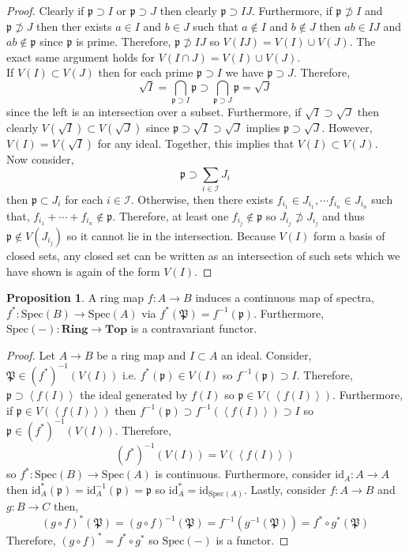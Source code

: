 \documentclass[12pt]{article}
\newcommand{\id}{\mathrm{id}}
\newcommand{\Ring}{\mathbf{Ring}}
\newcommand{\Spec}[1]{\mathrm{Spec}\left( #1 \right)}
\newcommand{\p}{\mathfrak{p}}
\renewcommand{\P}{\mathfrak{P}}
\theoremstyle{remark}
\theoremstyle{definition}
\newtheorem{proposition}[theorem]{Proposition}
\begin{document}
\begin{proof}
Clearly if $\p \supset I$ or $\p \supset J$ then clearly $\p \supset IJ$. Furthermore, if $\p \not\supset I$ and $\p \not\supset J$ then ther exists $a \in I$ and $b \in J$ such that $a \notin I$ and $b \notin J$ then $ab \in IJ$ and $ab \notin \p$ since $\p$ is prime. Therefore, $\p \not\supset IJ$ so $V(IJ) = V(I) \cup V(J)$. The exact same argument holds for $V(I \cap J) = V(I) \cup V(J)$.
\bigskip\\
If $V(I) \subset V(J)$ then for each prime $\p \supset I$ we have $\p \supset J$. Therefore,
\[  \sqrt{I} = \bigcap_{\p \supset I} \p \supset \bigcap_{\p \supset J} \p = \sqrt{J} \]
since the left is an intersection over a subset. Furthermore, if $\sqrt{I} \supset \sqrt{J}$ then clearly $V(\sqrt{I}) \subset V(\sqrt{J})$ since $\p \supset \sqrt{I} \supset \sqrt{J}$ implies $\p \supset \sqrt{J}$. However, $V(I) = V(\sqrt{I})$ for any ideal. Together, this implies that $V(I) \subset V(J)$. 
\bigskip\\
Now consider,
\[ \p \supset \sum_{i \in \mathcal{I}} J_i \]
then $\p \subset J_i$ for each $i \in \mathcal{I}$. Otherwise, then there exists $f_{i_1} \in J_{i_1}, \cdots f_{i_n} \in J_{i_n}$ such that, $f_{i_1} + \cdots + f_{i_n} \notin \p$. Therefore, at least one $f_{i_j} \notin \p$ so $J_{i_j} \not\supset J_{i_j}$ and thus $\p \notin V(J_{i_j})$ so it cannot lie in the intersection.
\bigskip
Because $V(I)$ form a basis of closed sets, any closed set can be written as an intersection of such sets which we have shown is again of the form $V(I)$. 
\end{proof}

\newcommand{\Top}{\mathbf{Top}}

\begin{proposition}
A ring map $f : A \to B$ induces a continuous map of spectra, $f^* : \Spec{B} \to \Spec{A}$ via $f^*(\P) = f^{-1}(\p)$. Furthermore, $\Spec{-} : \Ring \to \Top$ is a contravariant functor.
\end{proposition}

\begin{proof}
Let $A \to B$ be a ring map and $I \subset A$ an ideal. Consider, $\P \in (f^*)^{-1}(V(I))$ i.e. $f^*(\p) \in V(I)$ so $f^{-1}(\p) \supset I$. Therefore, $\p \supset \left< f(I) \right>$ the ideal generated by $f(I)$ so $\p \in V(\left< f(I) \right>)$. Furthermore, if $\p \in V(\left< f(I) \right>)$ then $f^{-1}(\p) \supset f^{-1}(\left< f(I) \right>) \supset I$ so $\p \in (f^*)^{-1}(V(I))$. Therefore,
\[ (f^*)^{-1}(V(I)) = V(\left< f(I) \right>) \]
so $f^* : \Spec{B} \to \Spec{A}$ is continuous. Furthermore, consider $\id_A : A \to A$ then $\id_A^*(\p) = \id_A^{-1}(\p) = \p$ so $\id_A^* = \id_{\Spec{A}}$. Lastly, consider $f : A \to B$ and $g : B \to C$ then,
\[ (g \circ f)^*(\P) = (g \circ f)^{-1}(\P) = f^{-1}(g^{-1}(\P)) = f^* \circ g^*(\P) \]
Therefore, $(g \circ f)^* = f^* \circ g^*$ so $\Spec{-}$ is a functor. 
\end{proof}
\end{document}
